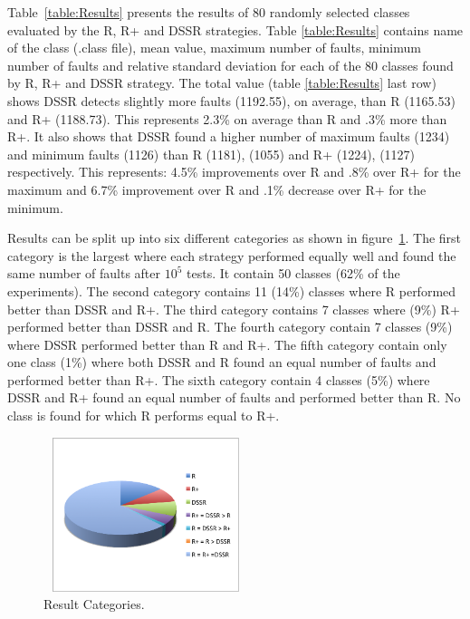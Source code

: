 \documentclass[conference]{IEEEtran}
\begin{document}
Table~\ref{table:Results} presents the results of 80 randomly selected classes evaluated by the R, R+ and DSSR strategies. Table \ref{table:Results} contains name of the class (.class file), mean value, maximum number of faults, minimum number of faults and relative standard deviation for each of the 80 classes found by R, R+ and DSSR strategy. The total value (table \ref{table:Results} last row) shows DSSR detects slightly more faults (1192.55), on average, than R (1165.53) and R+ (1188.73). This represents 2.3\% on average than R and .3\% more than R+. It also shows that DSSR found a higher number of maximum faults (1234) and minimum faults (1126) than R (1181), (1055) and R+ (1224), (1127) respectively. This represents: 4.5\% improvements over R and .8\% over R+ for the maximum and 6.7\% improvement over R and .1\% decrease over R+ for the minimum. 

Results can be split up into six different categories as shown in figure~\ref{fig:pie}. The first category is the largest where each strategy performed equally well and found the same number of faults after $10^5$ tests. It contain 50 classes (62\% of the experiments).
The second category contains 11 (14\%) classes where R performed better than DSSR and R+. 
The third category contains 7 classes where (9\%) R+ performed better than DSSR and R. 
 The fourth category contain 7 classes (9\%) where DSSR performed better than R and R+. 
The fifth category contain only one class (1\%) where both DSSR and R found an equal number of faults and performed better than R+. 
The sixth category contain 4 classes (5\%) where DSSR and R+ found an equal number of faults and performed better than R. 
No class is found for which R performs equal to R+.\\ 


\begin{figure}[ht]
\centering
\includegraphics[width=6cm,height=4.5cm]{pie1.png}
\caption{Result Categories.}
\label{fig:pie}
\end{figure}
\end{document}
